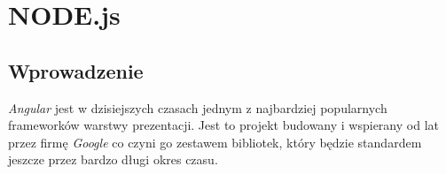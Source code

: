 \chapter{NODE.js}

\section{Wprowadzenie}
\textit{Angular} jest w dzisiejszych czasach jednym z najbardziej popularnych frameworków warstwy prezentacji. Jest to projekt budowany i wspierany od lat przez firmę \textit{Google} co czyni go zestawem bibliotek, który będzie standardem jeszcze przez bardzo długi okres czasu. 

